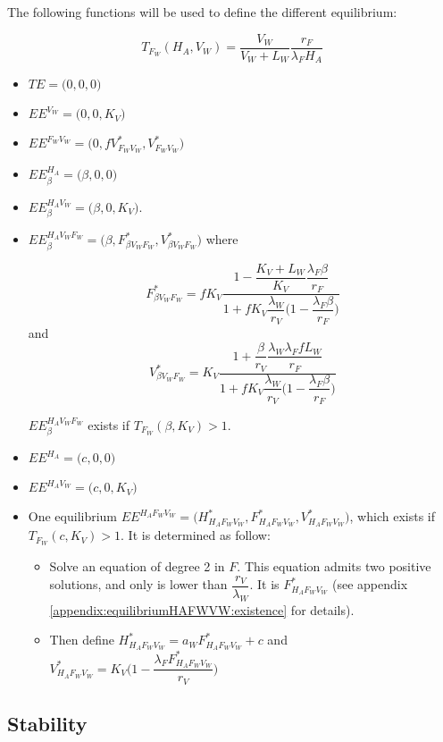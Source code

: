 \documentclass{article}
\newcommand{\lfw}{\lambda_{F}}
\newcommand{\lfv}{\lambda_{W}}
\begin{document}
The following functions will be used to define the different equilibrium:

\begin{equation}
T_{F_W}(H_A, V_W) = \dfrac{V_W}{V_W + L_W} \dfrac{r_F}{\lfw H_A}
\end{equation}

\begin{itemize}
\item $TE = \Big(0,0,0\Big)$
\item $EE^{V_W} = \Big(0,0 ,K_V\Big)$
\item $EE^{F_WV_W} = \Big(0, fV^*_{F_WV_W},V^*_{F_WV_W}\Big)$
\item $EE^{H_A}_\beta = \Big(\beta,0,0\Big)$
\item $EE^{H_AV_W}_\beta = \Big(\beta,0,K_V\Big)$.
\item $EE^{H_AV_WF_W}_\beta = \Big(\beta,F_{\beta V_WF_W}^*,V_{\beta V_WF_W}^*\Big)$ where

$$F_{\beta V_WF_W}^* = fK_V \dfrac{1 - \dfrac{K_V + L_W}{K_V}\dfrac{\lfw \beta}{r_F}}{1 + f K_V \dfrac{\lfv}{r_V} \Big(1 - \dfrac{\lfw \beta}{r_F}\Big)} $$
and
$$V_{\beta V_WF_W}^* = K_V \dfrac{1 + \dfrac{\beta}{r_V}\dfrac{\lfv \lfw f L_W}{r_F} }{1 + fK_V\dfrac{\lfv}{r_V}\Big(1 - \dfrac{\lfw \beta}{r_F}\Big)}
$$

$EE^{H_AV_WF_W}_\beta$ exists if $T_{F_W}(\beta, K_V) > 1$.

\item $EE^{H_A} = \Big(c, 0, 0\Big)$
\item $EE^{H_AV_W} = \Big(c, 0, K_V\Big)$
\item One equilibrium $EE^{H_AF_WV_W} = \Big(H^*_{H_AF_WV_W}, F^*_{H_AF_WV_W}, V^*_{H_AF_WV_W} \Big)$, which exists if $T_{F_W}(c, K_V) > 1$. It is determined as follow:

\begin{itemize}
\item Solve an equation of degree 2 in $F$. This equation admits two positive solutions, and only is lower than $\dfrac{r_V}{\lfv}$. It is $F^*_{H_AF_WV_W}$ (see appendix \ref{appendix:equilibriumHAFWVW:existence} for details). 
\item Then define $H_{H_AF_WV_W}^* = a_W F^*_{H_AF_WV_W} + c$ and $V^*_{H_AF_WV_W} = K_V \Big(1 - \dfrac{\lfw F^*_{H_AF_WV_W}}{r_V} \Big)$
\end{itemize}

\end{itemize}

\subsection{Stability}
\end{document}
